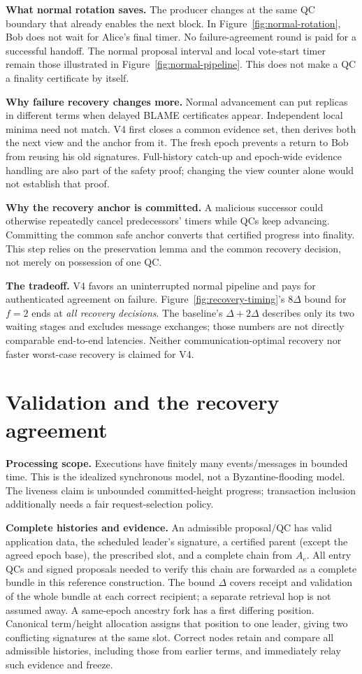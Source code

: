 \documentclass[10pt,a4paper]{article}
\begin{document}
\textbf{What normal rotation saves.} The producer changes at the same QC
boundary that already enables the next block. In Figure~\ref{fig:normal-rotation},
Bob does not wait for Alice's final timer. No failure-agreement round is
paid for a successful handoff. The normal proposal interval and local
vote-start timer remain those illustrated in Figure~\ref{fig:normal-pipeline}.
This does not make a QC a finality certificate by itself.

\textbf{Why failure recovery changes more.} Normal advancement can put
replicas in different terms when delayed BLAME certificates appear.
Independent local minima need not match. V4 first closes a common evidence
set, then derives both the next view and the anchor from it. The fresh epoch
prevents a return to Bob from reusing his old signatures. Full-history
catch-up and epoch-wide evidence handling are also part of the safety proof;
changing the view counter alone would not establish that proof.

\textbf{Why the recovery anchor is committed.} A malicious successor could
otherwise repeatedly cancel predecessors' timers while QCs keep advancing.
Committing the common safe anchor converts that certified progress into
finality. This step relies on the preservation lemma and the common recovery
decision, not merely on possession of one QC.

\textbf{The tradeoff.} V4 favors an uninterrupted normal pipeline and pays
for authenticated agreement on failure. Figure~\ref{fig:recovery-timing}'s
$8\Delta$ bound for $f=2$ ends at \emph{all recovery decisions}. The baseline's
$\Delta+2\Delta$ describes only its two waiting stages and excludes message
exchanges; those numbers are not directly comparable end-to-end latencies.
Neither communication-optimal recovery nor faster worst-case recovery is
claimed for V4.

\clearpage
\section*{Validation and the recovery agreement}\label{sec:agreement}
\textbf{Processing scope.} Executions have finitely many events/messages
in bounded time. This is the idealized synchronous model, not a
Byzantine-flooding model. The liveness claim is unbounded committed-height
progress; transaction inclusion additionally needs a fair request-selection
policy.

\textbf{Complete histories and evidence.} An admissible proposal/QC has valid
application data, the scheduled leader's signature, a certified parent
(except the agreed epoch base), the prescribed slot, and a complete chain
from $A_e$. All entry QCs and signed proposals needed to verify this chain
are forwarded as a complete bundle in this reference construction.
The bound $\Delta$ covers receipt and validation of the whole bundle at
each correct recipient; a separate retrieval hop is not assumed away. A same-epoch ancestry fork has a
first differing position. Canonical term/height allocation assigns that
position to one leader, giving two conflicting signatures at the same slot.
Correct nodes retain and compare all admissible histories, including those
from earlier terms, and immediately relay such evidence and freeze.
\end{document}
